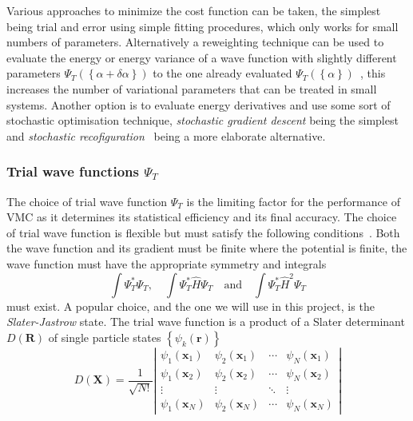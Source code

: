 \documentclass[final,3p,times,twocolumn]{elsarticle}
\begin{document}
	Various approaches to minimize the cost function can be taken, the simplest being trial and error using simple fitting procedures, which only works for small numbers of parameters. Alternatively a reweighting technique can be used to evaluate the energy or energy variance of a wave function with slightly different parameters $\Psi_{T}(\left\{\alpha + \delta \alpha\right\})$ to the one already evaluated $\Psi_{T}(\left\{\alpha\right\})$~\cite{umrigar1988optimized}, this increases the number of variational parameters that can be treated in small systems. Another option is to evaluate energy derivatives and use some sort of stochastic optimisation technique, \emph{stochastic gradient descent} being the simplest and \emph{stochastic recofiguration}~\cite{sorella1998green} being a more elaborate alternative. 
		
	\subsubsection{Trial wave functions $\Psi_{T}$}
	The choice of trial wave function $\Psi_{T}$ is the limiting factor for the performance of VMC as it determines its statistical efficiency and its final accuracy. The choice of trial wave function is flexible but must satisfy the following conditions~\cite{foulkes2001quantum}. Both the wave function and its gradient must be finite where the potential is finite, the wave function must have the appropriate symmetry and integrals 
	\begin{equation}
		\int \Psi_{T}^{*} \Psi_{T}, \quad \int \Psi_{T}^{*} \hat{H} \Psi_{T} \quad \text{and} \quad \int \Psi_{T}^{*} \hat{H}^{2} \Psi_{T}
	\end{equation}
	must exist. A popular choice, and the one we will use in this project, is the \emph{Slater-Jastrow} state. The trial wave function is a product of a Slater determinant $D(\mathbf{R})$ of single particle states $\left\{\psi_k(\mathbf{r})\right\}$ 
	\begin{equation}
		D(\mathbf{X}) = \frac{1}{\sqrt{N !}}\left|\begin{array}{cccc}\psi_{1}\left(\mathbf{x}_{1}\right) & \psi_{2}\left(\mathbf{x}_{1}\right) & \cdots & \psi_{N}\left(\mathbf{x}_{1}\right) \\ \psi_{1}\left(\mathbf{x}_{2}\right) & \psi_{2}\left(\mathbf{x}_{2}\right) & \cdots & \psi_{N}\left(\mathbf{x}_{2}\right) \\ \vdots & \vdots & \ddots & \vdots \\ \psi_{1}\left(\mathbf{x}_{N}\right) & \psi_{2}\left(\mathbf{x}_{N}\right) & \cdots & \psi_{N}\left(\mathbf{x}_{N}\right)\end{array}\right|
	\end{equation}	
\end{document}
